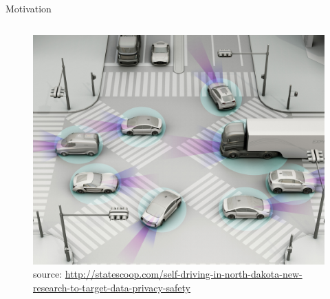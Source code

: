 \documentclass{beamer}
\theoremstyle{remark}
\begin{document}
\begin{frame}{Motivation}
\begin{columns}
	\begin{column}{.34\textwidth}
		\begin{figure}
			\centering
			\includegraphics[width=1\linewidth]{sdc.jpg}
			\caption*{\tiny source: \href{http://statescoop.com/self-driving-in-north-dakota-new-research-to-target-data-privacy-safety}{\tiny http://statescoop.com/self-driving-in-north-dakota-new-research-to-target-data-privacy-safety}}
		\end{figure}
	\end{column}
\end{columns}




%
\end{frame}
\end{document}
